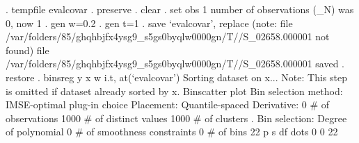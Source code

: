 . tempfile evalcovar
{\smallskip}
. preserve
{\smallskip}
. clear
{\smallskip}
. set obs 1
number of observations (_N) was 0, now 1
{\smallskip}
. gen w=0.2
{\smallskip}
. gen t=1
{\smallskip}
. save `evalcovar', replace
(note: file /var/folders/85/ghqhbjfx4ysg9_s5gs0byqlw0000gn/T//S_02658.000001 not found)
file /var/folders/85/ghqhbjfx4ysg9_s5gs0byqlw0000gn/T//S_02658.000001 saved
{\smallskip}
. restore
{\smallskip}
. binsreg y x w i.t, at(`evalcovar')
Sorting dataset on x...
Note: This step is omitted if dataset already sorted by x.
{\smallskip}
Binscatter plot
Bin selection method: IMSE-optimal plug-in choice
Placement: Quantile-spaced
Derivative: 0
{\smallskip}
\# of observations             {\VBAR}    1000
\# of distinct values          {\VBAR}    1000
\# of clusters                 {\VBAR}       .
Bin selection:                {\VBAR} 
         Degree of polynomial {\VBAR}       0
  \# of smoothness constraints {\VBAR}       0
                    \# of bins {\VBAR}      22
{\smallskip}
         {\VBAR}      p       s       df
 dots    {\VBAR}      0       0       22
